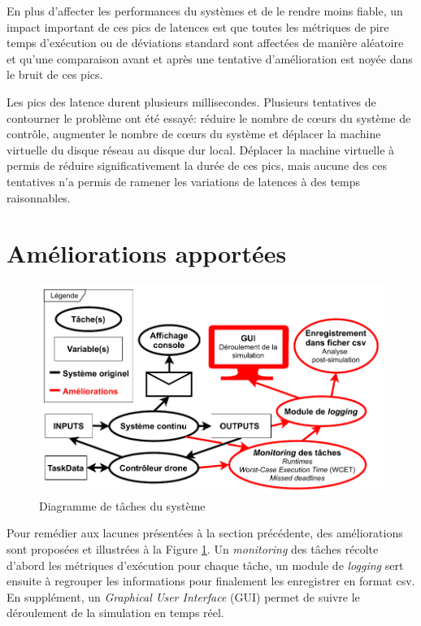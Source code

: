 \documentclass[journal]{IEEEtran}
\begin{document}
En plus d'affecter les performances du systèmes et de le rendre moins fiable, un impact important de ces pics de latences est que toutes les métriques de pire temps d'exécution ou de déviations standard sont affectées de manière aléatoire et qu'une comparaison avant et après une tentative d'amélioration est noyée dans le bruit de ces pics.

Les pics des latence durent plusieurs millisecondes. Plusieurs tentatives de contourner le problème ont été essayé: réduire le nombre de cœurs du système de contrôle, augmenter le nombre de cœurs du système et déplacer la machine virtuelle du disque réseau au disque dur local. Déplacer la machine virtuelle à permis de réduire significativement la durée de ces pics, mais aucune des ces tentatives n'a permis de ramener les variations de latences à des temps raisonnables.

\section{Améliorations apportées}
\label{ameliorations}

\begin{figure}
	\centering
	\captionsetup{justification=centering}
	\includegraphics[width=\linewidth]{diagrammeDeTaches_Simple.pdf}
	\caption{Diagramme de tâches du système}
	\label{taskDiagram}
\end{figure}

Pour remédier aux lacunes présentées à la section précédente, des améliorations sont proposées et illustrées à la Figure \ref{taskDiagram}. Un \textit{monitoring} des tâches récolte d'abord les métriques d'exécution pour chaque tâche, un module de \textit{logging} sert ensuite à regrouper les informations pour finalement les enregistrer en format csv. En supplément, un \textit{Graphical User Interface} (GUI) permet de suivre le déroulement de la simulation en temps réel.
\end{document}
